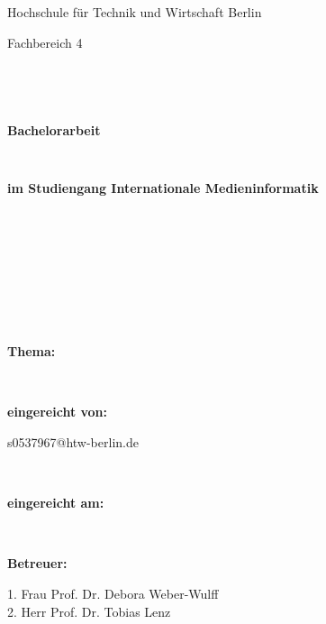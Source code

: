 \makeatletter
\begin{titlepage}

	\begin{center}
		\large{Hochschule für Technik und Wirtschaft Berlin}\\
	\end{center}

	\begin{center}
		\large{Fachbereich 4}
	\end{center}
	\begin{verbatim}




	\end{verbatim}
	\begin{center}
		\textbf{\LARGE{Bachelorarbeit}}
	\end{center}
	\begin{verbatim}


	\end{verbatim}
	\begin{center}
		\textbf{im Studiengang Internationale Medieninformatik}
	\end{center}
	\begin{verbatim}









	\end{verbatim}

	\begin{flushleft}
		\begin{minipage}{0.3\textwidth}
			\textbf{Thema:}
		\end{minipage}
		\begin{minipage}[t]{0.65\textwidth}
			\@title
		\end{minipage}\\[4ex]

		\begin{minipage}{0.3\textwidth}
			\textbf{eingereicht von:}
		\end{minipage}
		\begin{minipage}{0.65\textwidth}
			\@author \flq{}s0537967@htw-berlin.de\frq{}
		\end{minipage}\\[4ex]

		\begin{minipage}{0.3\textwidth}
			\textbf{eingereicht am:} 
		\end{minipage}
		\begin{minipage}{0.65\textwidth}
			\@date
		\end{minipage}\\[4ex]

		\begin{minipage}{0.3\textwidth}
			\textbf{Betreuer:}
		\end{minipage}
		\begin{minipage}[t]{0.65\textwidth}
			1. Frau Prof. Dr. Debora Weber-Wulff\\
			2. Herr Prof. Dr. Tobias Lenz
		\end{minipage}
	\end{flushleft}

\end{titlepage}
\makeatother